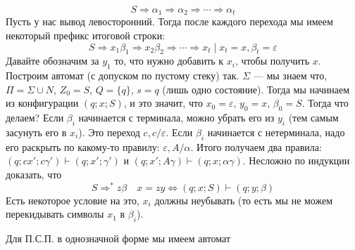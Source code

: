 \documentclass{article}
\begin{document}
\begin{itemize}
\begin{Proof}
            $$
            S\Rightarrow\alpha_1\Rightarrow\alpha_2\Rightarrow\cdots\Rightarrow\alpha_t
            $$
            Пусть у нас вывод левосторонний. Тогда после каждого перехода мы имеем некоторый префикс итоговой строки:
            $$
            S\Rightarrow x_1\beta_1\Rightarrow x_2\beta_2\Rightarrow\cdots\Rightarrow x_t\mid x_t=x,\beta_t=\varepsilon
            $$
            Давайте обозначим за $y_1$ то, что нужно добавить к $x_i$, чтобы получить $x$. Построим автомат (с допуском по пустому стеку) так. $\Sigma$ --- мы знаем что, $\Pi=\Sigma\cup N$, $Z_0=S$, $Q=\{q\}$, $s=q$ (лишь одно состояние). Тогда мы начинаем из конфигурации $(q;x;S)$, и это значит, что $x_0=\varepsilon$, $y_0=x$, $\beta_0=S$. Тогда что делаем? Если $\beta_i$ начинается с терминала, можно убрать его из $y_i$ (тем самым засунуть его в $x_i$). Это переход $c,c/\varepsilon$. Если $\beta_i$ начинается с нетерминала, надо его раскрыть по какому-то правилу: $\varepsilon,A/\alpha$. Итого получаем два правила: $(q;cx';c\gamma')\vdash(q;x';\gamma')$ и $(q;x';A\gamma)\vdash(q;x;\alpha\gamma)$. Несложно по индукции доказать, что
            $$
            S\Rightarrow^*z\beta\quad x=zy\Longleftrightarrow(q;x;S)\vdash(q;y;\beta)
            $$
            Есть некоторое условие на это, $x_i$ должны неубывать (то есть мы не можем перекидывать символы $x_1$ в $\beta_i$).
            \begin{Example}
                Для П.С.П. в однозначной форме мы имеем автомат
                \begin{figure}[H]
\end{figure}
\end{Example}
\end{Proof}
\end{itemize}
\end{document}
